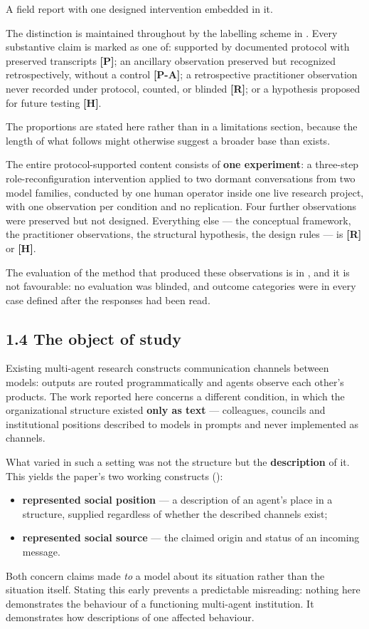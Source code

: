 A field report with one designed intervention embedded in it.

The distinction is maintained throughout by the labelling scheme in . Every substantive claim is marked as one of: supported by documented protocol with preserved transcripts \textbf{[P]}; an ancillary observation preserved but recognized retrospectively, without a control \textbf{[P-A]}; a retrospective practitioner observation never recorded under protocol, counted, or blinded \textbf{[R]}; or a hypothesis proposed for future testing \textbf{[H]}.

The proportions are stated here rather than in a limitations section, because the length of what follows might otherwise suggest a broader base than exists.

The entire protocol-supported content consists of \textbf{one experiment}: a three-step role-reconfiguration intervention applied to two dormant conversations from two model families, conducted by one human operator inside one live research project, with one observation per condition and no replication. Four further observations were preserved but not designed. Everything else — the conceptual framework, the practitioner observations, the structural hypothesis, the design rules — is \textbf{[R]} or \textbf{[H]}.

The evaluation of the method that produced these observations is in , and it is not favourable: no evaluation was blinded, and outcome categories were in every case defined after the responses had been read.


\subsection*{1.4 The object of study}
\label{sec:en:1.4}

Existing multi-agent research constructs communication channels between models: outputs are routed programmatically and agents observe each other's products. The work reported here concerns a different condition, in which the organizational structure existed \textbf{only as text} — colleagues, councils and institutional positions described to models in prompts and never implemented as channels.

What varied in such a setting was not the structure but the \textbf{description} of it. This yields the paper's two working constructs ():

\begin{itemize}
  \item \textbf{represented social position} — a description of an agent's place in a structure, supplied regardless of whether the described channels exist;
  \item \textbf{represented social source} — the claimed origin and status of an incoming message.
\end{itemize}
Both concern claims made \emph{to} a model about its situation rather than the situation itself. Stating this early prevents a predictable misreading: nothing here demonstrates the behaviour of a functioning multi-agent institution. It demonstrates how descriptions of one affected behaviour.


